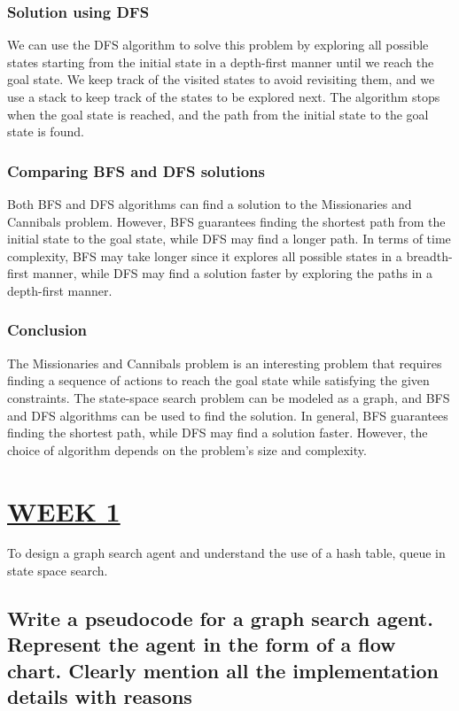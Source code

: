 \documentclass[15pt,journal]{IEEEtran}
\begin{document}
\subsubsection{Solution using DFS}
We can use the DFS algorithm to solve this problem by exploring all possible states starting from the initial state in a depth-first manner until we reach the goal state. We keep track of the visited states to avoid revisiting them, and we use a stack to keep track of the states to be explored next. The algorithm stops when the goal state is reached, and the path from the initial state to the goal state is found.

\subsubsection{Comparing BFS and DFS solutions}
Both BFS and DFS algorithms can find a solution to the Missionaries and Cannibals problem. However, BFS guarantees finding the shortest path from the initial state to the goal state, while DFS may find a longer path. In terms of time complexity, BFS may take longer since it explores all possible states in a breadth-first manner, while DFS may find a solution faster by exploring the paths in a depth-first manner.

\subsubsection{Conclusion}
The Missionaries and Cannibals problem is an interesting problem that requires finding a sequence of actions to reach the goal state while satisfying the given constraints. The state-space search problem can be modeled as a graph, and BFS and DFS algorithms can be used to find the solution. In general, BFS guarantees finding the shortest path, while DFS may find a solution faster. However, the choice of algorithm depends on the problem's size and complexity.

\section{\large{\underline{WEEK 1}}}
 To design a graph search agent and understand the use of a hash table, queue in state space search.
 
\subsection{Write a pseudocode for a graph search agent. Represent the agent in the form of a flow chart. Clearly mention all the implementation details with reasons}
\end{document}

